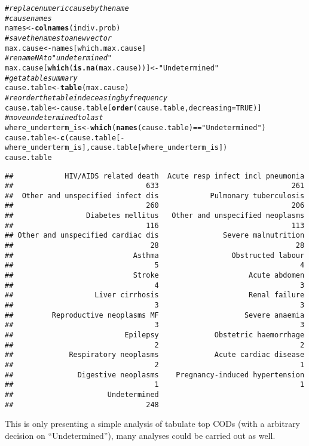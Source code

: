 \documentclass{article}\usepackage[]{graphicx}\usepackage[]{color}
\makeatletter
\newcommand{\hlnum}[1]{\textcolor[rgb]{0.686,0.059,0.569}{#1}}%
\newcommand{\hlstr}[1]{\textcolor[rgb]{0.192,0.494,0.8}{#1}}%
\newcommand{\hlcom}[1]{\textcolor[rgb]{0.678,0.584,0.686}{\textit{#1}}}%
\newcommand{\hlopt}[1]{\textcolor[rgb]{0,0,0}{#1}}%
\newcommand{\hlstd}[1]{\textcolor[rgb]{0.345,0.345,0.345}{#1}}%
\newcommand{\hlkwb}[1]{\textcolor[rgb]{0.69,0.353,0.396}{#1}}%
\newcommand{\hlkwc}[1]{\textcolor[rgb]{0.333,0.667,0.333}{#1}}%
\newcommand{\hlkwd}[1]{\textcolor[rgb]{0.737,0.353,0.396}{\textbf{#1}}}%
\newenvironment{kframe}{%
 \def\at@end@of@kframe{}%
 \ifinner\ifhmode%
  \def\at@end@of@kframe{\end{minipage}}%
  \begin{minipage}{\columnwidth}%
 \fi\fi%
 \def\FrameCommand##1{\hskip\@totalleftmargin \hskip-\fboxsep
 \colorbox{shadecolor}{##1}\hskip-\fboxsep
     \hskip-\linewidth \hskip-\@totalleftmargin \hskip\columnwidth}%
 \MakeFramed {\advance\hsize-\width
   \@totalleftmargin\z@ \linewidth\hsize
   \@setminipage}}%
 {\par\unskip\endMakeFramed%
 \at@end@of@kframe}
\newenvironment{knitrout}{}{} %
\makeatother
\begin{document}
\begin{knitrout}
\begin{kframe}
\begin{alltt}
\hlcom{# replace numeric cause by the name}
\hlcom{# cause names}
\hlstd{names} \hlkwb{<-} \hlkwd{colnames}\hlstd{(indiv.prob)}
\hlcom{# save the names to a new vector}
\hlstd{max.cause} \hlkwb{<-} \hlstd{names[which.max.cause]}
\hlcom{# rename NA to "undetermined"}
\hlstd{max.cause[}\hlkwd{which}\hlstd{(}\hlkwd{is.na}\hlstd{(max.cause))]} \hlkwb{<-} \hlstr{"Undetermined"}
\hlcom{# get a table summary}
\hlstd{cause.table} \hlkwb{<-} \hlkwd{table}\hlstd{(max.cause)}
\hlcom{# reorder the table in deceasing by frequency}
\hlstd{cause.table} \hlkwb{<-} \hlstd{cause.table[}\hlkwd{order}\hlstd{(cause.table,} \hlkwc{decreasing} \hlstd{=} \hlnum{TRUE}\hlstd{)]}
\hlcom{# move undetermined to last }
\hlstd{where_underterm_is} \hlkwb{<-} \hlkwd{which}\hlstd{(}\hlkwd{names}\hlstd{(cause.table)} \hlopt{==} \hlstr{"Undetermined"}\hlstd{)}
\hlstd{cause.table} \hlkwb{<-} \hlkwd{c}\hlstd{(cause.table[}\hlopt{-}\hlstd{where_underterm_is], cause.table[where_underterm_is])}
\hlstd{cause.table}
\end{alltt}
\begin{verbatim}
##            HIV/AIDS related death  Acute resp infect incl pneumonia 
##                               633                               261 
##  Other and unspecified infect dis            Pulmonary tuberculosis 
##                               260                               206 
##                 Diabetes mellitus   Other and unspecified neoplasms 
##                               116                               113 
## Other and unspecified cardiac dis               Severe malnutrition 
##                                28                                28 
##                            Asthma                 Obstructed labour 
##                                 5                                 4 
##                            Stroke                     Acute abdomen 
##                                 4                                 3 
##                   Liver cirrhosis                     Renal failure 
##                                 3                                 3 
##         Reproductive neoplasms MF                    Severe anaemia 
##                                 3                                 3 
##                          Epilepsy             Obstetric haemorrhage 
##                                 2                                 2 
##             Respiratory neoplasms             Acute cardiac disease 
##                                 2                                 1 
##               Digestive neoplasms    Pregnancy-induced hypertension 
##                                 1                                 1 
##                      Undetermined 
##                               248
\end{verbatim}
\end{kframe}
\end{knitrout}
This is only presenting a simple analysis of tabulate top CODs (with a arbitrary decision on ``Undetermined''), many analyses could be carried out as well. 
\end{document}
